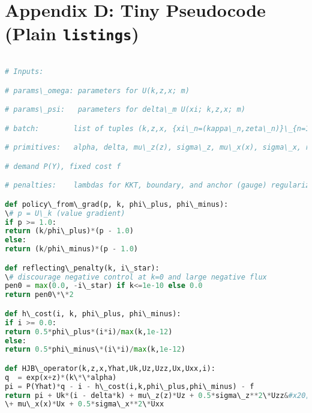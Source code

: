 ﻿\documentclass[11pt,letterpaper,oneside]{article}
\numberwithin{equation}{section}
\newcommand{\1}{\mathbf{1}}
\begin{document}
\section{Appendix D: Tiny Pseudocode (Plain \texorpdfstring{\texttt{listings}}{listings})}\label{app:code}

\lstset{
basicstyle=\ttfamily\small,
columns=fullflexible,
showstringspaces=false,
frame=single,
framerule=0.4pt,
breaklines=true,
tabsize=2,
captionpos=b
}

\begin{lstlisting}[language=Python,caption={Pseudo-JAX for (ME) residual with empirical measure}]

# Inputs:

# params\_omega: parameters for U(k,z,x; m)

# params\_psi:   parameters for delta\_m U(xi; k,z,x; m)

# batch:        list of tuples (k,z,x, {xi\_n=(kappa\_n,zeta\_n)}\_{n=1}^N )

# primitives:   alpha, delta, mu\_z(z), sigma\_z, mu\_x(x), sigma\_x, r(x),

# demand P(Y), fixed cost f

# penalties:    lambdas for KKT, boundary, and anchor (gauge) regularizers

def policy\_from\_grad(p, k, phi\_plus, phi\_minus):
\# p = U\_k (value gradient)
if p >= 1.0:
return (k/phi\_plus)*(p - 1.0)
else:
return (k/phi\_minus)*(p - 1.0)

def reflecting\_penalty(k, i\_star):
\# discourage negative control at k=0 and large negative flux
pen0 = max(0.0, -i\_star) if k<=1e-10 else 0.0
return pen0\*\*2

def h\_cost(i, k, phi\_plus, phi\_minus):
if i >= 0.0:
return 0.5*phi\_plus*(i*i)/max(k,1e-12)
else:
return 0.5*phi\_minus\*(i\*i)/max(k,1e-12)

def HJB\_operator(k,z,x,Yhat,Uk,Uz,Uzz,Ux,Uxx,i):
q  = exp(x+z)*(k\*\*alpha)
pi = P(Yhat)*q - i - h\_cost(i,k,phi\_plus,phi\_minus) - f
return pi + Uk*(i - delta*k) + mu\_z(z)*Uz + 0.5*sigma\_z**2\*Uzz&#x20;
\+ mu\_x(x)*Ux + 0.5*sigma\_x**2\*Uxx


\end{lstlisting}
\end{document}
